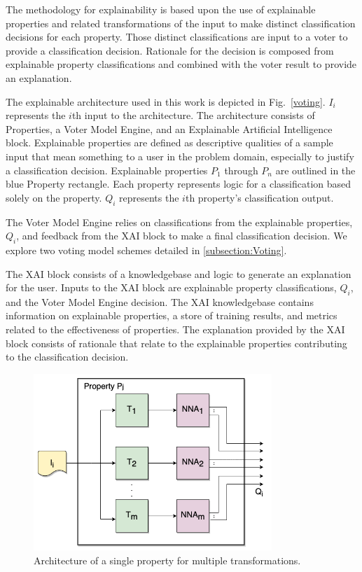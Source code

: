 \documentclass[conference]{IEEEtran}
\begin{document}
The methodology for explainability is based upon the use of explainable properties and related transformations of the input to make distinct classification decisions for each property.  Those distinct classifications are input to a voter to provide a classification decision.  Rationale for the decision is composed from explainable property classifications and combined with the voter result to provide an explanation. 

The explainable architecture used in this work is depicted in Fig.~\ref{voting}.  $I_i$ represents the $i$th input to the architecture.  The architecture consists of Properties, a Voter Model Engine, and an Explainable Artificial Intelligence block.   Explainable properties are defined as descriptive qualities of a sample input that mean something to a user in the problem domain, especially to justify a classification decision.   Explainable properties $P_1$ through $P_n$ are outlined in the blue Property rectangle.  Each property represents logic for a classification based solely on the property.   $Q_i$ represents the $i$th property's classification output.

The Voter Model Engine relies on classifications from the explainable properties, $Q_i$, and feedback from the XAI block to make a final classification decision.   We explore two voting model schemes detailed in \ref{subsection:Voting}.

The XAI block consists of a knowledgebase and logic to generate an explanation for the user.  Inputs to the XAI block are explainable property classifications, $Q_i$, and the Voter Model Engine decision.  The XAI knowledgebase contains information on explainable properties,  a store of training results, and metrics related to the effectiveness of properties.  The explanation provided by the XAI block consists of rationale that relate to the explainable properties contributing to the classification decision.

 \begin{figure}[htbp]
\centerline{\includegraphics[width=90mm]{./images/property_transforms.png}}
\caption{Architecture of a single property for multiple transformations.}
\label{proptrans}
\end{figure} 
\end{document}
